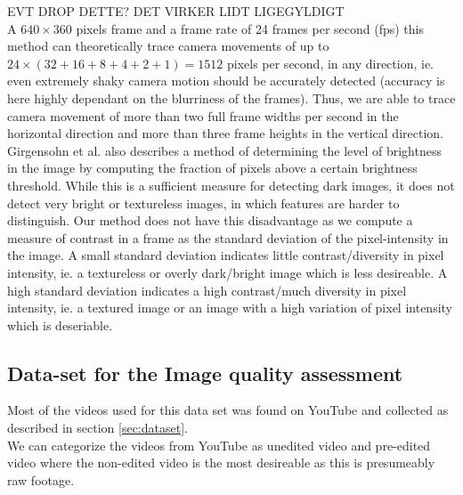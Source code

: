 %
EVT DROP DETTE? DET VIRKER LIDT LIGEGYLDIGT\\
A $640\times360$ pixels frame and a frame rate of 24 frames per second (fps) this method can theoretically trace camera movements of up to $24 \times (32+16+8+4+2+1) = 1512$ pixels per second, in any direction, ie. even extremely shaky camera motion should be accurately detected (accuracy is here highly dependant on the blurriness of the frames). Thus, we are able to trace camera movement of more than two full frame widths per second in the horizontal direction and more than three frame heights in the vertical direction.\\
%
Girgensohn et al. \cite{Girgensohn:2000:SAH:354401.354415} also describes a method of determining the level of brightness in the image by computing the fraction of pixels above a certain brightness threshold. While this is a sufficient measure for detecting dark images, it does not detect very bright or textureless images, in which features are harder to distinguish. Our method does not have this disadvantage as we compute a measure of contrast in a frame as the standard deviation of the pixel-intensity in the image.
A small standard deviation indicates little contrast/diversity in pixel intensity, ie. a textureless or overly dark/bright image which is less desireable.
A high standard deviation indicates a high contrast/much diversity in pixel intensity, ie. a textured image or an image with a high variation of pixel intensity which is deseriable.\\
% 
%
\subsection{Data-set for the Image quality assessment}\label{sec:framequalityassessmentdataset}
%
Most of the videos used for this data set was found on YouTube and collected as described in section \ref{sec:dataset}.\\
We can categorize the videos from YouTube as unedited video and pre-edited video where the non-edited video is the most desireable as this is presumeably raw footage.
%
